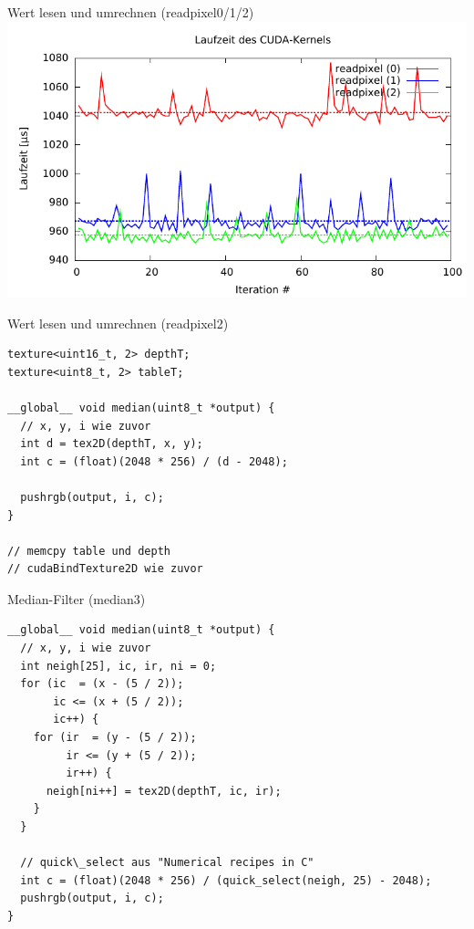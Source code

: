 \documentclass[compress]{beamer}
\begin{document}
\begin{frame}[fragile]{Wert lesen und umrechnen (readpixel0/1/2)}
\includegraphics[width=\textwidth]{readpixel12.pdf}
\end{frame}


\begin{frame}[fragile]{Wert lesen und umrechnen (readpixel2)}
\begin{lstlisting}
texture<uint16_t, 2> depthT;
texture<uint8_t, 2> tableT;

__global__ void median(uint8_t *output) {
  // x, y, i wie zuvor
  int d = tex2D(depthT, x, y);
  int c = (float)(2048 * 256) / (d - 2048);

  pushrgb(output, i, c);
}

// memcpy table und depth
// cudaBindTexture2D wie zuvor
\end{lstlisting}
\end{frame}

\begin{frame}[fragile]{Median-Filter (median3)}
\begin{lstlisting}
__global__ void median(uint8_t *output) {
  // x, y, i wie zuvor
  int neigh[25], ic, ir, ni = 0;
  for (ic  = (x - (5 / 2));
       ic <= (x + (5 / 2));
       ic++) {
    for (ir  = (y - (5 / 2));
         ir <= (y + (5 / 2));
         ir++) {
      neigh[ni++] = tex2D(depthT, ic, ir);
    }
  }

  // quick\_select aus "Numerical recipes in C"
  int c = (float)(2048 * 256) / (quick_select(neigh, 25) - 2048);
  pushrgb(output, i, c);
}
\end{lstlisting}
\end{frame}
\end{document}
